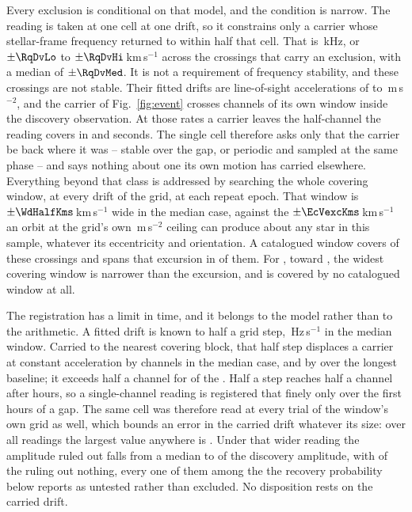 Every exclusion is conditional on that model, and the condition is narrow. The reading is taken at one cell at one drift, so it constrains only a
carrier whose stellar-frame frequency returned to within half that cell. That
is \TjChanKHz\,kHz, or $\pm\RqDvLo$ to $\pm\RqDvHi$\,km\,s$^{-1}$ across
the \RcNExcl{} crossings that carry an exclusion, with a median of
$\pm\RqDvMed$. It is not a requirement of frequency stability, and these crossings are
not stable. Their fitted drifts are line-of-sight accelerations of
\ZtALosLo{} to \ZtALosHi\,m\,s$^{-2}$, and the carrier of
Fig.~\ref{fig:event} crosses \EvADriftChan{} channels of its own window
inside the discovery observation. At those rates a carrier leaves the
half-channel the reading covers in \ZtSxLeaveSec{} and \ZtCpLeaveSec{}
seconds. The single cell therefore asks
only that the carrier be back where it was -- stable over the gap, or
periodic and sampled at the same phase -- and says nothing about one its own
motion has carried elsewhere. Everything beyond that class is addressed by searching the whole covering
window, at every drift of the grid, at each repeat epoch. That window is
$\pm\WdHalfKms$\,km\,s$^{-1}$ wide in the median case, against the
$\pm\EcVexcKms$\,km\,s$^{-1}$ an orbit at the grid's own
\WdAGrid\,m\,s$^{-2}$ ceiling can produce about any star in this sample,
whatever its eccentricity and orientation. A catalogued window covers
\WdNOrbTot{} of these \RcNExcl{} crossings and spans that excursion in
\EcNSpan{} of them. For \EcNShort, toward \EcShortStarList, the widest
covering window is narrower than the excursion, and \WdNNoCov{} is covered by
no catalogued window at all.

The registration has a limit in time, and it belongs to the model rather than
to the arithmetic. A fitted drift is known to half a grid step, \ZtStepMed\,Hz\,s$^{-1}$ in
the median window. Carried to the nearest covering block, that half step
displaces a carrier at constant acceleration by \ZtRegChanMed{} channels in
the median case, and by \ZtRegChanFarMed{} over the longest baseline; it
exceeds half a channel for \ZtNRegNear{} of the \RcNExcl. Half a step
reaches half a channel after \ZtRegHoursMed{} hours, so a single-channel
reading is registered that finely only over the first hours of a gap. The
same cell was therefore read at every trial of the window's own grid as well,
which bounds an error in the carried drift whatever its size: over all
\RcNRepeatMeas{} readings the largest value anywhere is \RcTMax. Under that
wider reading the amplitude ruled out falls from a median \RcFracMed{} to
\ZtFracWideMed{} of the discovery amplitude, with \ZtNWideVac{} of the
\RcNExcl{} ruling out nothing, every one of them among the \HjNPowerLo{}
the recovery probability below reports as untested rather than
excluded. No
disposition rests on the carried drift.

